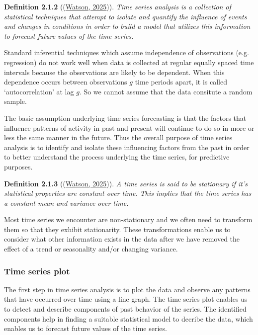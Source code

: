 \documentclass[a4paper, 10pt, fleqn]{article}
\begin{document}
\begin{flushleft}
      \textbf{Definition 2.1.2} ((\hyperref[Watson2025]{Watson, 2025})). \textit{Time series analysis is a collection of statistical techniques that attempt to isolate and quantify the influence of events and changes in conditions in order to build a model that utilizes this information to forecast future values of the time series.}

      \vspace{1em}

      Standard inferential techniques which assume independence of observations (e.g. regression) do not work well when data is collected at regular equally spaced time intervals because the observations are likely to be dependent. When this dependence occurs between observations $g$ time periods apart, it is called `autocorrelation' at lag $g$. So we cannot assume that the data consitute a random sample.

      \vspace{1em}

      The basic assumption underlying time series forecasting is that the factors that influence patterns of activity in past and present will continue to do so in more or less the same manner in the future. Thus the overall purpose of time series analysis is to identify and isolate these influencing factors from the past in order to better understand the process underlying the time series, for predictive purposes.

      \vspace{1em}

      \textbf{Definition 2.1.3} ((\hyperref[Watson2025]{Watson, 2025})). \textit{A time series is said to be stationary if it's statistical properties are constant over time. This implies that the time series has a constant mean and variance over time.}

      \vspace{1em}

      Most time series we encounter are non-stationary and we often need to transform them so that they exhibit stationarity. These transformations enable us to consider what other information exists in the data after we have removed the effect of a trend or seasonality and/or changing variance.

      \subsubsection*{Time series plot}

      The first step in time series analysis is to plot the data and observe any patterns that have occurred over time using a line graph. The time series plot enables us to detect and describe components of past behavior of the series. The identified components help in finding a suitable statistical model to decribe the data, which enables us to forecast future values of the time series.


\end{flushleft}
\end{document}
